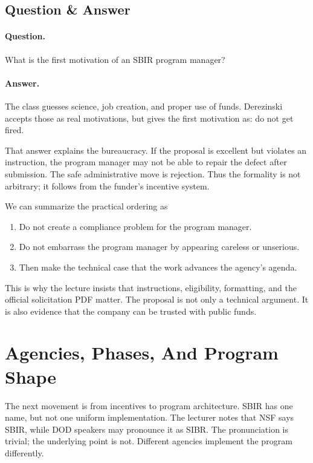 \subsection{Question \& Answer}

\paragraph{Question.}
What is the first motivation of an SBIR program manager?

\paragraph{Answer.}
The class guesses science, job creation, and proper use of funds. Derezinski accepts those as real motivations, but gives the first motivation as: do not get fired.

That answer explains the bureaucracy. If the proposal is excellent but violates an instruction, the program manager may not be able to repair the defect after submission. The safe administrative move is rejection. Thus the formality is not arbitrary; it follows from the funder's incentive system.

We can summarize the practical ordering as

\begin{enumerate}
\item Do not create a compliance problem for the program manager.
\item Do not embarrass the program manager by appearing careless or unserious.
\item Then make the technical case that the work advances the agency's agenda.
\end{enumerate}

This is why the lecture insists that instructions, eligibility, formatting, and the official solicitation PDF matter. The proposal is not only a technical argument. It is also evidence that the company can be trusted with public funds.

\section{Agencies, Phases, And Program Shape}

The next movement is from incentives to program architecture. SBIR has one name, but not one uniform implementation. The lecturer notes that NSF says SBIR, while DOD speakers may pronounce it as SIBR. The pronunciation is trivial; the underlying point is not. Different agencies implement the program differently.

